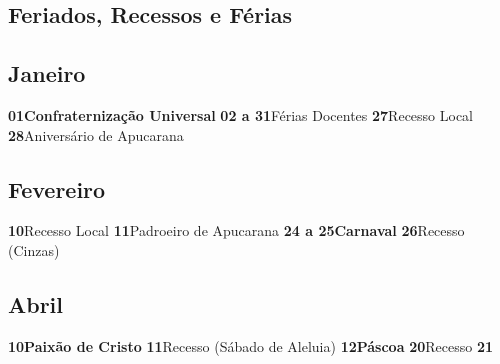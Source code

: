 \documentclass[thesis]{hmcposter}
\begin{document}
\begin{poster}
\newpage\onespacing \section{\color{hmcorange}Feriados, Recessos e Férias}\subsection{Janeiro}\textbf{01}\quad \quad \quad \quad \textbf{Confraternização Universal} \newline\textbf{02 a 31}\quad \quad Férias Docentes \newline\textbf{27}\quad \quad \quad \quad Recesso Local \newline\textbf{28}\quad \quad \quad \quad Aniversário de Apucarana \newline\subsection{Fevereiro}\textbf{10}\quad \quad \quad \quad Recesso Local \newline\textbf{11}\quad \quad \quad \quad Padroeiro de Apucarana \newline\textbf{24 a 25}\quad \quad \textbf{Carnaval} \newline\textbf{26}\quad \quad \quad \quad Recesso (Cinzas) \newline\subsection{Abril}\textbf{10}\quad \quad \quad \quad \textbf{Paixão de Cristo} \newline\textbf{11}\quad \quad \quad \quad Recesso (Sábado de Aleluia) \newline\textbf{12}\quad \quad \quad \quad \textbf{Páscoa} \newline\textbf{20}\quad \quad \quad \quad Recesso \newline\textbf{21}\quad \quad \quad \quad 
\end{poster}
\end{document}
